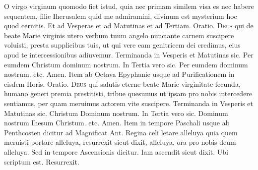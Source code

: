 \begin{multicols*}{2}
 O virgo virginum quomodo fiet istud, quia nec primam similem visa es nec habere sequentem, filie Iherusalem quid me admiramini, divinum est mysterium hoc quod cernitis. {\color{Red} Et ad Vesperas et ad Matutinas et ad Tertiam. Oratio.}
\lettrine[lines=2]{\zallmancaps \color{Red} D}{eus} qui de beate Marie virginis utero verbum tuum angelo nunciante carnem suscipere voluisti, presta supplicibus tuis, ut qui vere eam genitricem dei credimus, eius apud te intercessionibus adiuvemur.
{\color{Red} Terminanda in Vesperis et Matutinas sic.} Per eumdem Christum dominum nostrum. {\color{Red} In Tertia vero sic.} Per eumdem dominum nostrum. etc. Amen. {\color{Red} Item ab Octava Epyphanie usque ad Purificationem in eisdem Horis. Oratio.}
\lettrine[lines=2]{\zallmancaps \color{Blue} D}{eus} qui salutis eterne beate Marie virginitate fecunda, humano generi premia prestitisti, tribue quesumus ut ipsam pro nobis intercedere sentiamus, per quam meruimus actorem vite suscipere.
{\color{Red} Terminanda in Vesperis et Matutinas sic.} Christum Dominum nostrum. {\color{Red} In Tertia vero sic.} Dominum nostrum Ihesum Christum. etc. Amen. {\color{Red} Item in tempore Paschali usque ab Penthcosten dicitur ad Magnificat Ant.} Regina celi letare alleluya quia quem meruisti portare alleluya, resurrexit sicut dixit, alleluya, ora pro nobis deum alleluya.
{\color{Red} Sed in tempore Ascensionis dicitur.} Iam ascendit sicut dixit. {\color{Red} Ubi scriptum est.} Resurrexit.



\end{multicols*}




\thispagestyle{fancy}
\fancyhead[RO,LE]{\rightmark}

